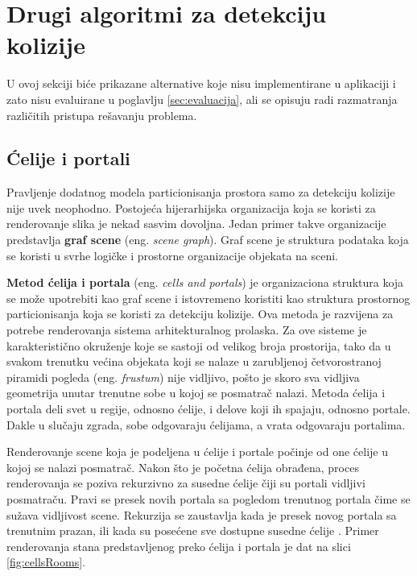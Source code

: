 \documentclass[12pt,oneside]{memoir}
\begin{document}
\section{Drugi algoritmi za detekciju kolizije}

U ovoj sekciji biće prikazane alternative koje nisu implementirane u aplikaciji i zato nisu evaluirane u poglavlju \ref{sec:evaluacija},
ali se opisuju radi razmatranja različitih pristupa rešavanju problema.

\subsection{Ćelije i portali}
\label{subsec:cells}

Pravljenje dodatnog modela particionisanja prostora samo za detekciju kolizije nije uvek neophodno.
Postojeća hijerarhijska organizacija koja se koristi za renderovanje slika je nekad sasvim dovoljna.
Jedan primer takve organizacije predstavlja \textbf{graf scene} (eng. {\em scene graph}).
Graf scene je struktura podataka koja se koristi u svrhe logičke i prostorne organizacije objekata na sceni.

\textbf{Metod ćelija i portala} (eng. {\em cells and portals}) je organizaciona struktura koja se može upotrebiti kao graf scene
i istovremeno koristiti kao struktura prostornog particionisanja koja se koristi za detekciju kolizije.
Ova metoda je razvijena za potrebe renderovanja sistema arhitekturalnog prolaska. 
Za ove sisteme je karakteristično okruženje koje se sastoji od velikog broja prostorija, tako da u svakom trenutku
većina objekata koji se nalaze u zarubljenoj četvorostranoj piramidi pogleda (eng. {\em frustum})
nije vidljivo, pošto je skoro sva vidljiva geometrija unutar trenutne sobe u kojoj se posmatrač nalazi.
Metoda ćelija i portala deli svet u regije, odnosno ćelije, i delove koji ih spajaju, odnosno portale.
Dakle u slučaju zgrada, sobe odgovaraju ćelijama, a vrata odgovaraju portalima. 

Renderovanje scene koja je podeljena u ćelije i portale počinje od one ćelije u kojoj se nalazi posmatrač. 
Nakon što je početna ćelija obrađena, proces renderovanja se poziva rekurzivno
za susedne ćelije čiji su portali vidljivi posmatraču. 
Pravi se presek novih portala sa pogledom trenutnog portala čime se sužava vidljivost scene.
Rekurzija se zaustavlja kada je presek novog portala sa trenutnim prazan, ili kada su posećene sve dostupne susedne ćelije \cite{glavnaKnjiga}.
Primer renderovanja stana predstavljenog preko ćelija i portala je dat na slici \ref{fig:cellsRooms}.
\end{document}
